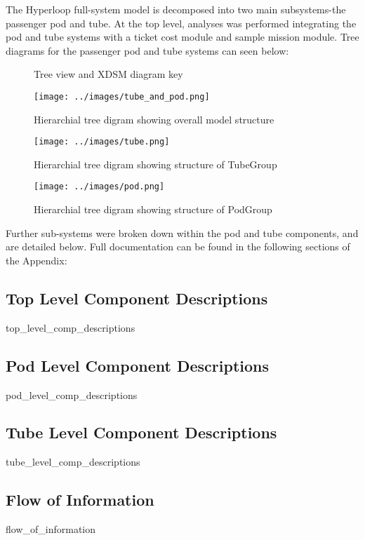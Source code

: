 The Hyperloop full-system model is decomposed into two main subsystems-the passenger pod and tube. At the top level, analyses was performed integrating the pod and tube systems with a ticket cost module and sample mission module. Tree diagrams for the passenger pod and tube systems can seen below:


\usetikzlibrary{arrows,chains,positioning,scopes,shapes.geometric,shapes.misc,shadows}
\begin{figure}
	\centering
	\caption{Tree view and XDSM diagram key}
	\label{fig:key}
\end{figure}

\begin{figure}
	\centering
	\texttt{[image: ../images/tube\_and\_pod.png]}
	\caption{Hierarchial tree digram showing overall model structure}
	\label{fig:tree:tube_and_pod}
\end{figure}

\begin{figure}
	\centering
	\texttt{[image: ../images/tube.png]}
	\caption{Hierarchial tree digram showing structure of TubeGroup}
	\label{fig:tree:tube}
\end{figure}

\begin{figure}
	\centering
	\texttt{[image: ../images/pod.png]}
	\caption{Hierarchial tree digram showing structure of PodGroup}
	\label{fig:tube}
\end{figure}

Further sub-systems were broken down within the pod and tube components, and are detailed below. Full documentation can be found in the following sections of the Appendix: 

\subsection{Top Level Component Descriptions}
	{top_level_comp_descriptions}
\subsection{Pod Level Component Descriptions}
	{pod_level_comp_descriptions}
\subsection{Tube Level Component Descriptions}
	{tube_level_comp_descriptions}
\subsection{Flow of Information}
	{flow_of_information}


